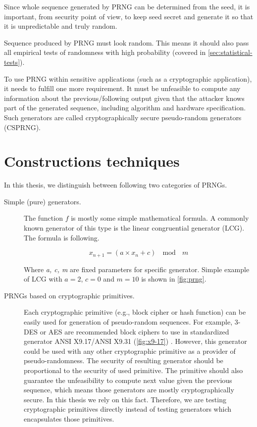 \documentclass[
    digital,    %
    oneside,    %
    color,
    11pt,
    nocover,
    notable,
    nolof,
    nolot,
    final
]{fithesis3}
\renewcommand\_{\textunderscore\allowbreak}
\begin{document}
Since whole sequence generated by PRNG can be determined from the seed, it is important, from security point of view, to keep seed secret and generate it so that it is unpredictable and truly random.

Sequence produced by PRNG must look random. This means it should also pass all empirical tests of randomness with high probability (covered in \cref{sec:statistical-tests}). \cite{schneier1996applied}

To use PRNG within sensitive applications (such as a cryptographic application), it needs to fulfill one more requirement. It must be unfeasible to compute any information about the previous/following output given that the attacker knows part of the generated sequence, including algorithm and hardware specification. Such generators are called cryptographically secure pseudo-random generators (CSPRNG). \cite{schneier1996applied}

\section{Constructions techniques}

In this thesis, we distinguish between following two categories of PRNGs.

\begin{description}
	\item[Simple (pure) generators.] The function $f$ is mostly some simple mathematical formula. A commonly known generator of this type is the linear congruential generator (LCG). The formula is following. \cite{LEcuyer07testu01}
	
	\begin{equation}
	x_{n+1} = \left( a \times x_n + c \right)~~\bmod~~m
	\label{formula:lcg}
	\end{equation}	
	
	Where \textit{a, c, m} are fixed parameters for specific generator. Simple example of LCG with $a = 2$, $c = 0$ and $m = 10$ is shown in \cref{fig:prng}. 
	
	\item[PRNGs based on cryptographic primitives.] Each cryptographic primitive (e.g., block cipher or hash function) can be easily used for generation of pseudo-random sequences. For example, 3-DES or AES are recommended \cite{Keller05nist-recommendedrandom} block ciphers to use in standardized generator ANSI X9.17/ANSI X9.31 (\cref{fig:x9-17}) \cite{ansi1985american}. However, this generator could be used with any other cryptographic primitive as a provider of pseudo-randomness. The security of resulting generator should be proportional to the security of used primitive. The primitive should also guarantee the unfeasibility to compute next value given the previous sequence, which means those generators are mostly cryptographically secure. In this thesis we rely on this fact. Therefore, we are testing cryptographic primitives directly instead of testing generators which encapsulates those primitives.

\end{description} 
\end{document}
